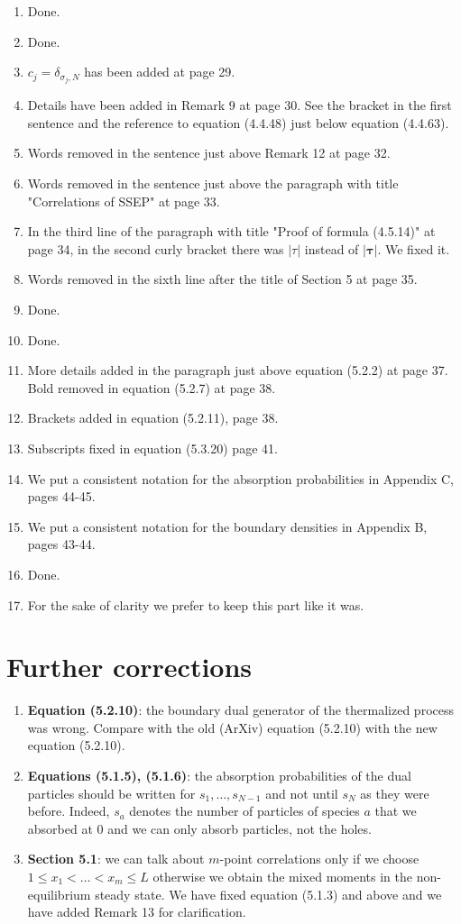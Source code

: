 \documentclass[10pt]{article}
\numberwithin{equation}{section}
\numberwithin{equation}{subsection}
\begin{document}
\begin{enumerate}
			\item Done.
			\item Done.
			\item $c_{j}=\delta_{\sigma_{j},N}$ has been added at page 29.
			\item Details have been added in Remark 9 at page 30. See the bracket in the first sentence and the reference to equation (4.4.48) just below equation (4.4.63).
			\item Words removed in the sentence just above Remark 12 at page 32. 
			\item Words removed in the sentence just above the paragraph with title "Correlations of SSEP" at page 33.
			\item In the third line of the paragraph with title "Proof of formula (4.5.14)" at page 34, in the second curly bracket there was $|\tau|$ instead of $|\bm{\tau}|$. We fixed it.
			\item Words removed in the sixth line after the title of Section 5 at page 35. 
			\item Done.
			\item Done.
			\item More details added in the paragraph just above equation (5.2.2) at page 37. Bold removed in equation (5.2.7) at page 38.
			\item Brackets added in equation (5.2.11), page 38.
			\item Subscripts fixed in equation (5.3.20) page 41.
			\item We put a consistent notation for the absorption probabilities in Appendix C, pages 44-45. 
			\item We put a consistent notation for the boundary densities in Appendix B, pages 43-44.
			\item Done.
			\item For the sake of clarity we prefer to keep this part like it was.
		\end{enumerate}
\section*{Further corrections}
\begin{enumerate}
\item \textbf{Equation (5.2.10)}: the boundary dual generator of the thermalized process was wrong. Compare with the old (ArXiv) equation (5.2.10) with the new equation (5.2.10).
\item \textbf{Equations (5.1.5), (5.1.6)}: the absorption probabilities of the dual particles should be written for $s_{1},\ldots,s_{N-1}$ and not until $s_{N}$ as they were before. Indeed, $s_{a}$ denotes the number of particles of species $a$ that we absorbed at $0$ and we can only absorb particles, not the holes. 
\item \textbf{Section 5.1}: we can talk about $m$-point correlations only if we choose $1\leq x_{1}<\ldots<x_{m}\leq L$ otherwise  we obtain the mixed moments in the non-equilibrium steady state. We have fixed equation (5.1.3) and above and we have added Remark 13 for  clarification.
\end{enumerate}
	
\end{document}
